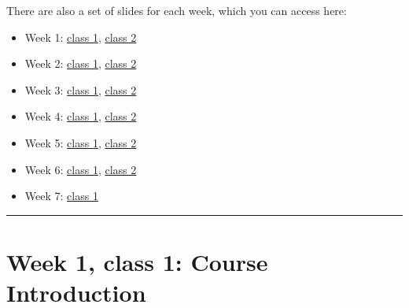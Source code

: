 \documentclass[
]{book}
\begin{document}
There are also a set of slides for each week, which you can access here:

\begin{itemize}
\item
  Week 1: \href{https://comhis.github.io/applying-network-analysis-to-humanities/slides/1-1-introduction.html}{class
  1},
  \href{https://comhis.github.io/applying-network-analysis-to-humanities/slides/1-2-intro-to-r.html}{class
  2}
\item
  Week 2: \href{https://comhis.github.io/applying-network-analysis-to-humanities/slides/2-1-network-data.html}{class
  1},
  \href{https://comhis.github.io/applying-network-analysis-to-humanities/slides/2-2-data-cleaning.html}{class
  2}
\item
  Week 3: \href{https://comhis.github.io/applying-network-analysis-to-humanities/slides/3-1-fundamentals-data-modelling.html}{class
  1},
  \href{https://comhis.github.io/applying-network-analysis-to-humanities/slides/3-2-building-data-model.html}{class
  2}
\item
  Week 4: \href{https://comhis.github.io/applying-network-analysis-to-humanities/slides/4-1-fundamentals.html}{class
  1},
  \href{https://comhis.github.io/applying-network-analysis-to-humanities/slides/4-2-networks-with-r.html}{class
  2}
\item
  Week 5: \href{https://comhis.github.io/applying-network-analysis-to-humanities/slides/5-1-visualising-with-ggraph.html}{class
  1},
  \href{https://comhis.github.io/applying-network-analysis-to-humanities/slides/visualising-gephi.html}{class
  2}
\item
  Week 6: \href{https://comhis.github.io/applying-network-analysis-to-humanities/slides/bipartite-networks.html}{class
  1},
  \href{https://comhis.github.io/applying-network-analysis-to-humanities/slides/6-2-literary-linguistic.html}{class
  2}
\item
  Week 7: \href{https://comhis.github.io/applying-network-analysis-to-humanities/slides/7-reflections.html}{class
  1}
\end{itemize}

\begin{center}\rule{0.5\linewidth}{0.5pt}\end{center}

\hypertarget{week-1-class-1-course-introduction}{%
\chapter{Week 1, class 1: Course Introduction}\label{week-1-class-1-course-introduction}}
\end{document}
